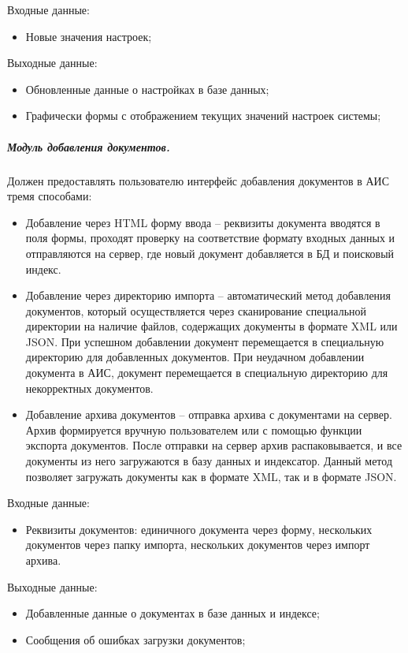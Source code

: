Входные данные:
\begin{itemize}
\item Новые значения настроек;
\end{itemize}

Выходные данные:
\begin{itemize}
\item Обновленные данные о настройках в базе данных;
\item Графически формы с отображением текущих значений настроек системы;
\end{itemize}

\subparagraph{Модуль добавления документов.} \hfill

Должен предоставлять пользователю интерфейс добавления документов в АИС тремя способами:
\begin{itemize}
\item Добавление через HTML форму ввода -- реквизиты документа вводятся в поля формы, проходят проверку на соответствие формату входных данных и отправляются на сервер, где новый документ добавляется в БД и поисковый индекс.
\item Добавление через директорию импорта -- автоматический метод добавления документов, который осуществляется через сканирование специальной директории на наличие файлов, содержащих документы в формате XML или JSON. При успешном добавлении документ перемещается в специальную директорию для добавленных документов. При неудачном добавлении документа в АИС, документ перемещается в специальную директорию для некорректных документов.
\item Добавление архива документов -- отправка архива с документами на сервер. Архив формируется вручную пользователем или с помощью функции экспорта документов. После отправки на сервер архив распаковывается, и все документы из него загружаются в базу данных и индексатор. Данный метод позволяет загружать документы как в формате XML, так и в формате JSON.
\end{itemize}

Входные данные:
\begin{itemize}
\item Реквизиты документов: единичного документа через форму, нескольких документов через папку импорта, нескольких документов через импорт архива.
\end{itemize}

Выходные данные:
\begin{itemize}
\item Добавленные данные о документах в базе данных и индексе;
\item Сообщения об ошибках загрузки документов;
\end{itemize}

